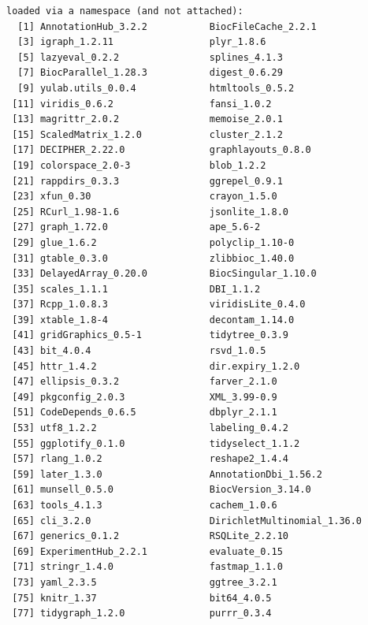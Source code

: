 \documentclass[
]{book}
\begin{document}
\begin{verbatim}
loaded via a namespace (and not attached):
  [1] AnnotationHub_3.2.2           BiocFileCache_2.2.1          
  [3] igraph_1.2.11                 plyr_1.8.6                   
  [5] lazyeval_0.2.2                splines_4.1.3                
  [7] BiocParallel_1.28.3           digest_0.6.29                
  [9] yulab.utils_0.0.4             htmltools_0.5.2              
 [11] viridis_0.6.2                 fansi_1.0.2                  
 [13] magrittr_2.0.2                memoise_2.0.1                
 [15] ScaledMatrix_1.2.0            cluster_2.1.2                
 [17] DECIPHER_2.22.0               graphlayouts_0.8.0           
 [19] colorspace_2.0-3              blob_1.2.2                   
 [21] rappdirs_0.3.3                ggrepel_0.9.1                
 [23] xfun_0.30                     crayon_1.5.0                 
 [25] RCurl_1.98-1.6                jsonlite_1.8.0               
 [27] graph_1.72.0                  ape_5.6-2                    
 [29] glue_1.6.2                    polyclip_1.10-0              
 [31] gtable_0.3.0                  zlibbioc_1.40.0              
 [33] DelayedArray_0.20.0           BiocSingular_1.10.0          
 [35] scales_1.1.1                  DBI_1.1.2                    
 [37] Rcpp_1.0.8.3                  viridisLite_0.4.0            
 [39] xtable_1.8-4                  decontam_1.14.0              
 [41] gridGraphics_0.5-1            tidytree_0.3.9               
 [43] bit_4.0.4                     rsvd_1.0.5                   
 [45] httr_1.4.2                    dir.expiry_1.2.0             
 [47] ellipsis_0.3.2                farver_2.1.0                 
 [49] pkgconfig_2.0.3               XML_3.99-0.9                 
 [51] CodeDepends_0.6.5             dbplyr_2.1.1                 
 [53] utf8_1.2.2                    labeling_0.4.2               
 [55] ggplotify_0.1.0               tidyselect_1.1.2             
 [57] rlang_1.0.2                   reshape2_1.4.4               
 [59] later_1.3.0                   AnnotationDbi_1.56.2         
 [61] munsell_0.5.0                 BiocVersion_3.14.0           
 [63] tools_4.1.3                   cachem_1.0.6                 
 [65] cli_3.2.0                     DirichletMultinomial_1.36.0  
 [67] generics_0.1.2                RSQLite_2.2.10               
 [69] ExperimentHub_2.2.1           evaluate_0.15                
 [71] stringr_1.4.0                 fastmap_1.1.0                
 [73] yaml_2.3.5                    ggtree_3.2.1                 
 [75] knitr_1.37                    bit64_4.0.5                  
 [77] tidygraph_1.2.0               purrr_0.3.4                  

\end{verbatim}
\end{document}
